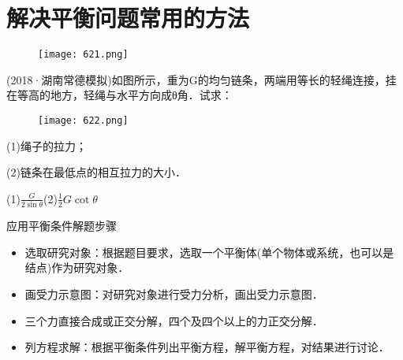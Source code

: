 \documentclass[cn,11pt]{elegantbook}
\begin{document}
\newpage\section{解决平衡问题常用的方法}
\begin{figure}[htbp]
   \centering
   \texttt{[image: 621.png]}
\end{figure}

\begin{example}
   (2018·湖南常德模拟)如图所示，重为G的均匀链条，两端用等长的轻绳连接，挂在等高的地方，轻绳与水平方向成θ角．试求：

   \begin{figure}[htbp]
      \centering
      \texttt{[image: 622.png]}
   \end{figure}
   
   (1)绳子的拉力；
   
   (2)链条在最低点的相互拉力的大小．
   \begin{solution}
      (1)$\frac{G}{2 \sin \theta}$(2)$\frac{1}{2}G\cot\theta$
     
   \end{solution}
\end{example}
\begin{note}
   应用平衡条件解题步骤
   \begin{itemize}
      \item 选取研究对象：根据题目要求，选取一个平衡体(单个物体或系统，也可以是结点)作为研究对象．
      \item 画受力示意图：对研究对象进行受力分析，画出受力示意图．
      \item 三个力直接合成或正交分解，四个及四个以上的力正交分解．
      \item 列方程求解：根据平衡条件列出平衡方程，解平衡方程，对结果进行讨论．
      
   \end{itemize}
   
\end{note}
\end{document}
